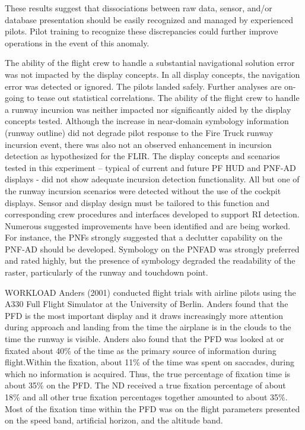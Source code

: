 \documentclass[utf8,bachelor,manualbib]{gradu3}
\begin{document}
These results suggest that dissociations between raw data, sensor, and/or database presentation should be
easily recognized and managed by experienced pilots. Pilot training to recognize these discrepancies could
further improve operations in the event of this anomaly. \citep{baileyym2007}



The ability of the flight crew to handle a substantial navigational solution error was not impacted by the
display concepts. In all display concepts, the navigation error was detected or ignored. The pilots landed
safely. Further analyses are on-going to tease out statistical correlations.
The ability of the flight crew to handle a runway incursion was neither impacted nor significantly aided by the
display concepts tested. Although the increase in near-domain symbology information (runway outline) did
not degrade pilot response to the Fire Truck runway incursion event, there was also not an observed
enhancement in incursion detection as hypothesized for the FLIR. The display concepts and scenarios tested
in this experiment – typical of current and future PF HUD and PNF-AD displays - did not show adequate
incursion detection functionality. All but one of the runway incursion scenarios were detected without the use of the cockpit displays. Sensor and display design must be tailored to this function and corresponding crew
procedures and interfaces developed to support RI detection.
Numerous suggested improvements have been identified and are being worked. For instance, the PNFs
strongly suggested that a declutter capability on the PNF-AD should be developed. Symbology on the PNFAD
was strongly preferred and rated highly, but the presence of symbology degraded the readability of the
raster, particularly of the runway and touchdown point. \citep{baileyym2007}



WORKLOAD
Anders (2001) conducted flight trials with airline pilots using the A330 Full Flight
Simulator at the University of Berlin. Anders found that the PFD is the most important
display and it draws increasingly more attention during approach and landing
from the time the airplane is in the clouds to the time the runway is visible. Anders
also found that the PFD was looked at or fixated about 40\% of the time as the
primary source of information during flight.Within the fixation, about 11\% of the
time was spent on saccades, during which no information is acquired. Thus, the
true percentage of fixation time is about 35\% on the PFD. The ND received a true
fixation percentage of about 18\% and all other true fixation percentages together
amounted to about 35\%. Most of the fixation time within the PFD was on the flight
parameters presented on the speed band, artificial horizon, and the altitude band. \citep{schnell2004}
\end{document}
